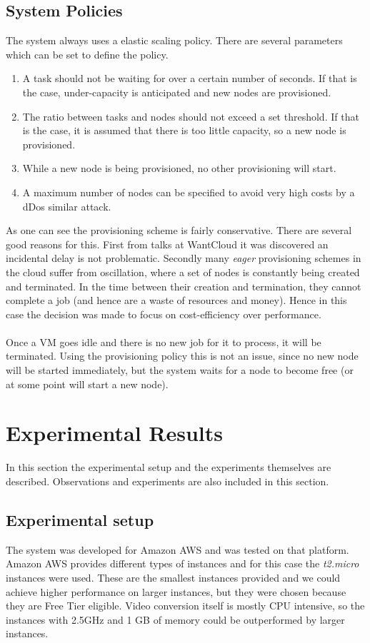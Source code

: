 \documentclass[a4paper]{IEEEtran}
\begin{document}
\subsection{System Policies}

The system always uses a elastic scaling policy. There are several parameters which can be set to define the policy.

\begin{enumerate}
\item A task should not be waiting for over a certain number of seconds.
If that is the case, under-capacity is anticipated and new nodes are provisioned.
\item The ratio between tasks and nodes should not exceed a set threshold. 
If that is the case, it is assumed that there is too little capacity, so a new node is provisioned.
\item While a new node is being provisioned, no other provisioning will start.
\item A maximum number of nodes can be specified to avoid very high costs by a dDos similar attack.
\end{enumerate}

As one can see the provisioning scheme is fairly conservative.
There are several good reasons for this.
First from talks at WantCloud it was discovered an incidental delay is not problematic.
Secondly many \textit{eager} provisioning schemes in the cloud suffer from oscillation, where a set of nodes is constantly being created and terminated.
In the time between their creation and termination, they cannot complete a job (and hence are a waste of resources and money).
Hence in this case the decision was made to focus on cost-efficiency over performance.
\\
\\
Once a VM goes idle and there is no new job for it to process, it will be terminated.
Using the provisioning policy this is not an issue, since no new node will be started immediately, but the system waits for a node to become free (or at some point will start a new node).

\section{Experimental Results}
In this section the experimental setup and the experiments themselves are described.
Observations and experiments are also included in this section.

\subsection{Experimental setup}
The system was developed for Amazon AWS and was tested on that platform.
Amazon AWS provides different types of instances and for this case the \emph{t2.micro} instances were used.
These are the smallest instances provided and we could achieve higher performance on larger instances,
 but they were chosen because they are Free Tier eligible.
Video conversion itself is mostly CPU intensive, so the instances with 2.5GHz and 1 GB of memory could be outperformed by larger instances.
\end{document}
